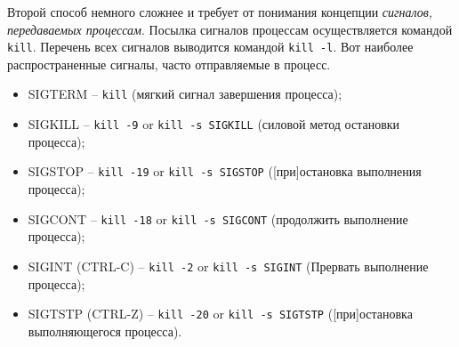 \documentclass[a4paper,12pt,final,openany]{extbook}
\providecommand{\tightlist}{%
  \setlength{\itemsep}{0pt}\setlength{\parskip}{0pt}}
\begin{document}
Второй способ немного сложнее и требует от понимания концепции
\emph{сигналов, передаваемых процессам}. Посылка сигналов процессам
осуществляется командой \texttt{kill}. Перечень всех сигналов выводится
командой \texttt{kill\ -l}. Вот наиболее распространенные
сигналы, часто отправляемые в процесс.
\begin{itemize}
\tightlist
\item
  SIGTERM -- \texttt{kill} (мягкий сигнал завершения процесса);
\item
  SIGKILL -- \texttt{kill\ -9} or \texttt{kill\ -s\ SIGKILL} (силовой
  метод остановки процесса);
\item
  SIGSTOP -- \texttt{kill\ -19} or \texttt{kill\ -s\ SIGSTOP}
  ({[}при{]}остановка выполнения процесса);
\item
  SIGCONT -- \texttt{kill\ -18} or \texttt{kill\ -s\ SIGCONT} (продолжить
  выполнение процесса);
\item
  SIGINT (CTRL-C) -- \texttt{kill\ -2} or \texttt{kill\ -s\ SIGINT}
  (Прервать выполнение процесса);
\item
  SIGTSTP (CTRL-Z) -- \texttt{kill\ -20} or \texttt{kill\ -s\ SIGTSTP}
  ({[}при{]}остановка выполняющегося процесса).
\end{itemize}
\end{document}
